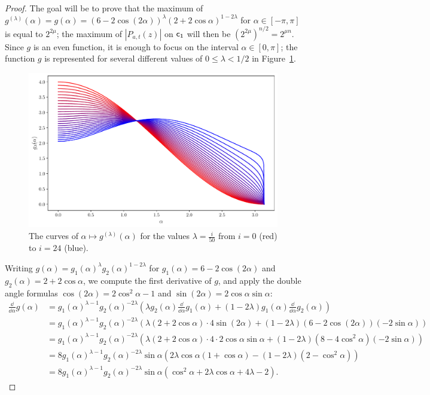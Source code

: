 \documentclass[11pt]{llncs}
\begin{document}
\begin{proof}
    The goal will be to prove that the maximum of $g^{(\lambda)}(\alpha)=g(\alpha)=(6-2\cos(2\alpha))^\lambda(2+2\cos\alpha)^{1-2\lambda}$ for $\alpha\in[-\pi,\pi]$ is equal to $2^{2\mu}$; the maximum of $|P_{a,t}(z)|$ on $\mathsf{c_1}$ will then be $\left(2^{2\mu}\right)^{n/2}=2^{\mu n}$. Since $g$ is an even function, it is enough to focus on the interval $\alpha\in[0,\pi]$; the function $g$ is represented for several different values of $0\leq\lambda<1/2$ in Figure~\ref{fig:family_curves_g}.

    \begin{figure}
    	\centering
    	\includegraphics[width=11cm]{family_curves_g.pdf}
        \vspace{-4mm}
    	\caption{The curves of $\alpha\mapsto g^{(\lambda)}(\alpha)$ for the values $\lambda=\frac{i}{50}$ from $i=0$ (red) to $i=24$ (blue).}
    	\label{fig:family_curves_g}
    \end{figure}
    
    Writing $g(\alpha)=g_1(\alpha)^{\lambda}g_2(\alpha)^{1-2\lambda}$ for $g_1(\alpha)=6-2\cos(2\alpha)$ and $g_2(\alpha)=2+2\cos\alpha$, we compute the first derivative of $g$, and apply the double angle formulas $\cos(2\alpha)=2\cos^2\alpha-1$ and $\sin(2\alpha)=2\cos\alpha\sin\alpha$:
    \begin{align*}
         \frac{\dd}{\dd\alpha}g(\alpha)&=g_1(\alpha)^{\lambda-1}g_2(\alpha)^{-2\lambda}\left(\lambda g_2(\alpha)\frac{\dd}{\dd\alpha}g_1(\alpha)+(1-2\lambda)g_1(\alpha)\frac{\dd}{\dd\alpha}g_2(\alpha)\right)\\
         &=g_1(\alpha)^{\lambda-1}g_2(\alpha)^{-2\lambda}\left(\lambda(2+2\cos\alpha)\cdot4\sin(2\alpha)+(1-2\lambda)(6-2\cos(2\alpha))(-2\sin\alpha)\right)\\
         &=g_1(\alpha)^{\lambda-1}g_2(\alpha)^{-2\lambda}\left(\lambda(2+2\cos\alpha)\cdot4\cdot2\cos\alpha\sin\alpha+(1-2\lambda)\left(8-4\cos^2\alpha\right)(-2\sin\alpha)\right)\\
         &=8g_1(\alpha)^{\lambda-1}g_2(\alpha)^{-2\lambda}\sin\alpha\left(2\lambda \cos\alpha(1+\cos\alpha)-(1-2\lambda)\left(2-\cos^2\alpha\right)\right)\\
         &=8g_1(\alpha)^{\lambda-1}g_2(\alpha)^{-2\lambda}\sin\alpha\left(\cos^2\alpha+2\lambda\cos\alpha+4\lambda-2\right).
    \end{align*}
    

\end{proof}
\end{document}
